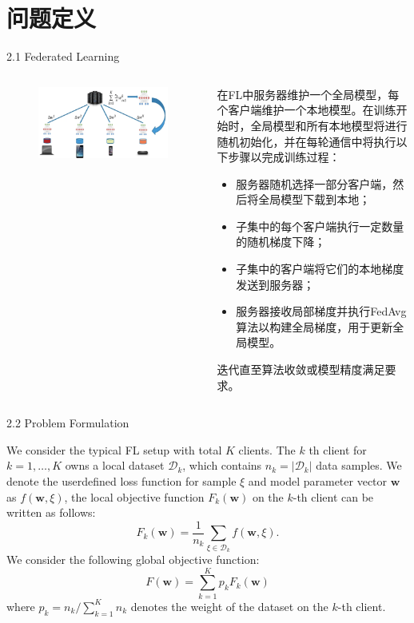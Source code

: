 \documentclass{sintefbeamer}
\theoremstyle{definition}
\begin{document}
\section{问题定义}

\begin{frame}{2.1 Federated Learning}

\begin{columns}
\begin{column}{0.4\textwidth}
\begin{figure}[ht]
\centering
\includegraphics[width=1\textwidth]{images/fl_arch}
\end{figure}
\end{column}
\begin{column}{0.6\textwidth}
 在FL中服务器维护一个全局模型，每个客户端维护一个本地模型。在训练开始时，全局模型和所有本地模型将进行随机初始化，并在每轮通信中将执行以下步骤以完成训练过程：
\begin{itemize}
\item 服务器随机选择一部分客户端，然后将全局模型下载到本地；
\item 子集中的每个客户端执行一定数量的随机梯度下降；
\item 子集中的客户端将它们的本地梯度发送到服务器；
\item 服务器接收局部梯度并执行FedAvg算法以构建全局梯度，用于更新全局模型。
\end{itemize}
迭代直至算法收敛或模型精度满足要求。
\end{column}
\end{columns}


\end{frame}

\begin{frame}{2.2 Problem Formulation}

We consider the typical FL setup with total $K$ clients. The $k$ th client for $k=1, \ldots, K$ owns a local dataset $\mathcal{D}_k$, which contains $n_k=\left|\mathcal{D}_k\right|$ data samples. We denote the userdefined loss function for sample $\xi$ and model parameter vector $\mathbf{w}$ as $f(\mathbf{w}, \xi)$, the local objective function $F_k(\mathbf{w})$ on the $k$-th client can be written as follows:
$$
F_k(\mathbf{w})=\frac{1}{n_k} \sum_{\xi \in \mathcal{D}_k} f(\mathbf{w}, \xi) .
$$
We consider the following global objective function:
$$
F(\mathbf{w})=\sum_{k=1}^K p_k F_k(\mathbf{w})
$$
where $p_k=n_k / \sum_{k=1}^K n_k$ denotes the weight of the dataset on the $k$-th client. 
\end{frame}
\end{document}
